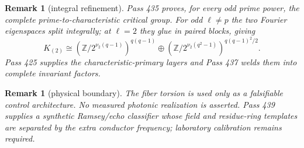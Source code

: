 \documentclass[11pt]{article}
\newtheorem{remark}[theorem]{Remark}
\newcommand{\ZZ}{\mathbb Z}
\begin{document}
\begin{remark}[integral refinement]
Pass 435 proves, for every odd prime power, the complete prime-to-characteristic
critical group. For odd $\ell\neq p$ the two Fourier eigenspaces split
integrally; at $\ell=2$ they glue in paired blocks, giving
\[
K_{(2)}\cong
(\ZZ/2^{\nu_2(q-1)})^{q(q-1)}\oplus
(\ZZ/2^{\nu_2(q^2-1)})^{q(q-1)^2/2}.
\]
Pass 425 supplies the characteristic-primary layers and Pass 437 welds them
into complete invariant factors.
\end{remark}

\begin{remark}[physical boundary]
The fiber torsion is used only as a falsifiable control architecture. No
measured photonic realization is asserted. Pass 439 supplies a synthetic
Ramsey/echo classifier whose field and residue-ring templates are separated by
the extra conductor frequency; laboratory calibration remains required.
\end{remark}
\end{document}
